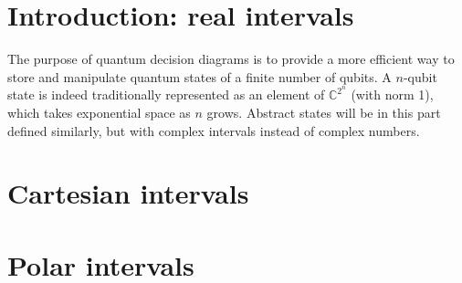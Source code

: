 \section{Introduction: real intervals}

The purpose of quantum decision diagrams is to provide a more efficient way to store and manipulate quantum states of a finite number of qubits. A $n$-qubit state is indeed traditionally represented as an element of $\mathbb{C}^{2^n}$ (with norm 1), which takes exponential space as $n$ grows. Abstract states will be in this part defined similarly, but with complex intervals instead of complex numbers.



\section{Cartesian intervals}



\section{Polar intervals}
\label{polar}


